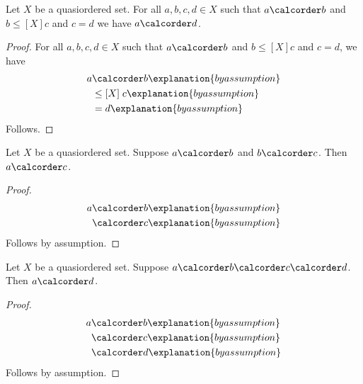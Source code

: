 


\begin{proposition}\label{calculation_generalized_diamond_guarded}
    Let $X$ be a quasiordered set.
    For all $a,b,c,d\in X$ such that
        $a\calcorder b$ and $b\mathrel{\leq[X]}c$ and $c=d$
        we have $a\calcorder d$.
\end{proposition}
\begin{proof}
    For all $a,b,c,d\in X$ such that
        $a\calcorder b$ and $b\mathrel{\leq[X]}c$ and $c=d$, we have
    \begin{align*}
        a
            &\calcorder b
                \explanation{by assumption}
                \\
            &\mathrel{\leq[X]} c
                \explanation{by assumption}
                \\
            &= d
                \explanation{by assumption}
    \end{align*}
    Follows.
\end{proof}

\begin{proposition}\label{calculation_generalized_diamond_contextual_views}
    Let $X$ be a quasiordered set.
    Suppose $a\calcorder b$ and $b\calcorder c$.
    Then $a\calcorder c$.
\end{proposition}
\begin{proof}
    \begin{align*}
        a &\calcorder b \explanation{by assumption} \\
          &\calcorder c \explanation{by assumption}
    \end{align*}
    Follows by assumption.
\end{proof}

\begin{proposition}\label{calculation_repeated_diamond_fold}
    Let $X$ be a quasiordered set.
    Suppose $a\calcorder b\calcorder c\calcorder d$.
    Then $a\calcorder d$.
\end{proposition}
\begin{proof}
    \begin{align*}
        a
            &\calcorder b
                \explanation{by assumption}
                \\
            &\calcorder c
                \explanation{by assumption}
                \\
            &\calcorder d
                \explanation{by assumption}
    \end{align*}
    Follows by assumption.
\end{proof}
